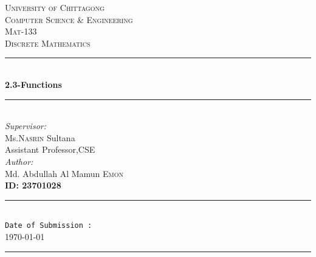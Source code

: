 \documentclass[12pt]{article}
\begin{document}
\begin{titlepage}
\newcommand{\HRule}{\rule{\linewidth}{0.5mm}} 
\center 
\textsc{\LARGE University of Chittagong}\\[1.2cm] 
\textsc{\Large Computer Science \& Engineering}\\[0.5cm] 
\textsc{\large Mat-133\\[0.1cm]Discrete Mathematics}\\[0.5cm] 
\HRule \\[0.4cm]
{ \huge \bfseries 2.3-Functions}\\[0.4cm] 
\HRule \\[1.5cm]
\centering
\emph{Supervisor:} \\
\LARGE Ms.\textsc{Nasrin} Sultana \\
\small Assistant Professor,CSE\\
\vspace{1cm}
\emph{Author:}\\
\large Md. Abdullah Al Mamun \textsc{Emon} \\
\textbf{ID: 23701028} \\
\vspace{1.5cm}
\HRule \\
\texttt{Date of Submission :} \\
\vspace{0.3cm}
{\Large \today}\\ 
\HRule
\vfill
\end{titlepage}
\end{document}
